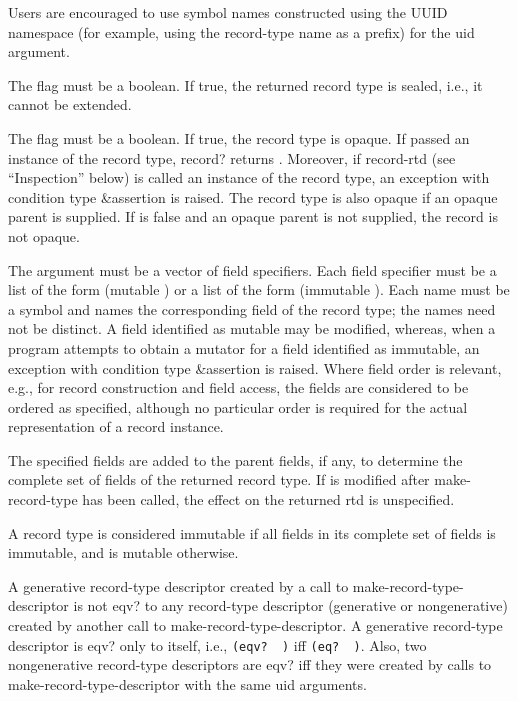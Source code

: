 \begin{entry}{%
}
\begin{note}   
  Users are encouraged to use symbol names
  constructed using the UUID namespace (for example, using the
  record-type name as a prefix) for the uid argument.
\end{note}

The  flag must be a boolean. If true, the returned record type
is sealed, i.e., it cannot be extended.

The  flag must be a boolean. If true, the record type
is opaque.
If passed an instance of the record type,
{\cf record?} returns
\schfalse{}.  Moreover, if {\cf record-rtd} (see ``Inspection'' below)
is called an instance of the record type, 
an exception with condition type {\cf\&assertion} is raised.
The record type is also opaque if an opaque parent is
supplied.  If  is false and an opaque parent is not
supplied, the record is not opaque.

The  argument must be a vector of field specifiers. Each
field specifier must be a list of the form {\cf (mutable )}
or a list of the form {\cf (immutable )}.
Each name must be a symbol and names the corresponding field of the record
type; the names need not be distinct.  A field identified as mutable may
be modified, whereas, when a program attempts to obtain a mutator for a field identified
as immutable, an exception with condition type {\cf\&assertion} is raised.
Where field order is relevant, e.g., for record construction and field
access, the fields are considered to be ordered as specified, although
no particular order is required for the actual representation of a
record instance.

The specified fields are added to the parent fields, if any, to determine
the complete set of fields of the returned record type.
If  is modified after {\cf make-record-type}
has been called, the effect on the returned
rtd is unspecified.

A record type is considered immutable if all fields
in its complete set of fields is immutable, and is mutable otherwise.

A generative record-type descriptor created by a call to {\cf
  make-record-type-descriptor} is not {\cf eqv?} to any record-type
descriptor (generative or nongenerative) created by another call to
{\cf make-record-type-descriptor}. A generative record-type descriptor
is {\cf eqv?}  only to itself, i.e., {\tt (eqv?~ )} iff
{\tt (eq?~ )}.
Also, two nongenerative record-type descriptors are {\cf eqv?} iff they were
created by calls to {\cf make-record-type-descriptor} with the same
uid arguments.


\end{entry}
